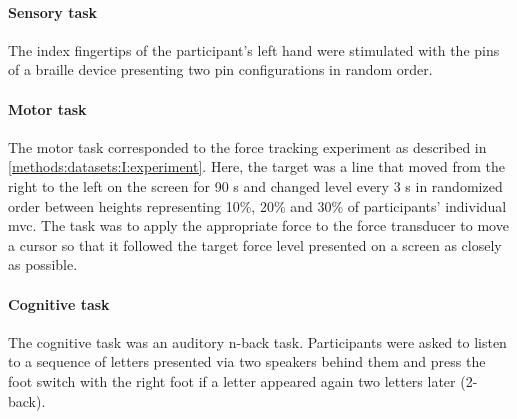 \paragraph{Sensory task}
The index fingertips of the participant's left hand were stimulated with the pins of a braille device presenting two pin configurations in random order. 
\paragraph{Motor task} 
The motor task corresponded to the force tracking experiment as described in \autoref{methods:datasets:I:experiment}. Here, the target was a line that moved from the right to the left on the screen for 90 s and changed level every 3 s in randomized order between heights representing 10\%, 20\% and 30\% of participants' individual \gls{mvc}. The task was to apply the appropriate force to the force transducer to move a cursor so that it followed the target force level presented on a screen as closely as possible.
\paragraph{Cognitive task}
The cognitive task was an auditory n-back task. Participants were asked to listen to a sequence of letters presented via two speakers behind them and press the foot switch with the right foot if a letter appeared again two letters later (2-back).

